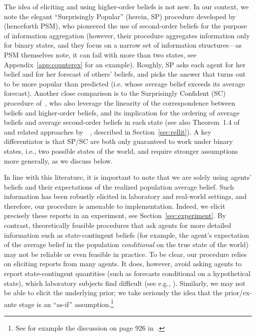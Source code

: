 \documentclass[12pt,reqno]{amsart}
\begin{document}
The idea of eliciting and using higher-order beliefs is not new. In our context, we note the elegant ``Surprisingly Popular'' (herein, SP) procedure developed by~\cite{prelec2017solution} (henceforth PSM), who pioneered the use of second-order beliefs for the purpose of information aggregation (however, their procedure aggregates information only for binary states, and they focus on a narrow set of information structures---as PSM themselves note, it can fail with more than two states, see Appendix~\ref{app:counterex} for an example). Roughly, SP asks each agent for her belief and for her forecast of others' beliefs, and picks the answer that turns out to be more popular than predicted (i.e. whose average belief exceeds its average forecast). Another close comparison is to the Surprisingly Confident (SC) procedure of~\cite{doi:10.1287/mnsc.2020.3919}, who also leverage the linearity of the correspondence between beliefs and higher-order beliefs, and its implication for the ordering of average beliefs and average second-order beliefs in each state (see also Theorem~1.4 of~\cite{prelec2017solution} and related approaches by~~\cite{prelec2022general}, described in Section~\ref{sec:rellit}). A key differentiator is that SP/SC are both only guaranteed to work under binary states, i.e., two possible states of the world, and require stronger assumptions more generally, as we discuss below.

In line with this literature, it is important to note that we are solely using agents’ beliefs and  their expectations of the realized population average belief. Such information has been robustly elicited in laboratory and real-world settings, and therefore, our procedure is amenable to implementation.  Indeed, we elicit precisely these reports in an experiment, see Section~\ref{sec:experiment}. By contrast, theoretically feasible procedures that ask agents for more detailed information such as state-contingent beliefs (for example, the agent's expectation of the average belief in the population \emph{conditional} on the true state of the world) may not be reliable or even feasible in practice.  To be clear, our procedure relies on eliciting reports from many agents. It does, however, avoid asking agents to report state-contingent quantities (such as forecasts conditional on a hypothetical state), which laboratory subjects find difficult (see e.g., \cite{charness2009winnerscurse, esponda2014hypothetical, ngangoue2021learning}).
Similarly, we may not be able to elicit the underlying prior; we take seriously the idea that the prior/ex-ante stage is an ``as-if'' assumption.\footnote{See for example the discussion on page 926 in~\cite{gul1998comment}.}
\end{document}

